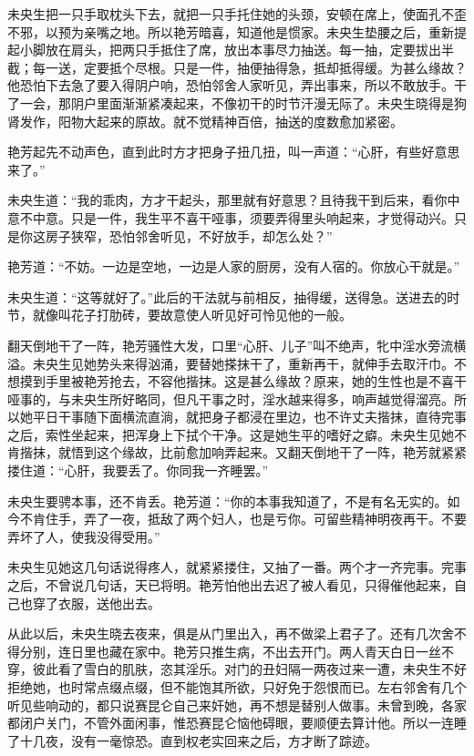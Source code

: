\documentclass[a4paper,12pt,UTF8,twoside]{ctexbook}
\begin{document}
未央生把一只手取枕头下去，就把一只手托住她的头颈，安顿在席上，使面孔不歪不邪，以预为亲嘴之地。所以艳芳暗喜，知道他是惯家。未央生垫腰之后，重新提起小脚放在肩头，把两只手抵住了席，放出本事尽力抽送。每一抽，定要拔出半截；每一送，定要抵个尽根。只是一件，抽便抽得急，抵却抵得缓。为甚么缘故？他恐怕下去急了要入得阴户响，恐怕邻舍人家听见，弄出事来，所以不敢放手。干了一会，那阴户里面渐渐紧凑起来，不像初干的时节汗漫无际了。未央生晓得是狗肾发作，阳物大起来的原故。就不觉精神百倍，抽送的度数愈加紧密。

艳芳起先不动声色，直到此时方才把身子扭几扭，叫一声道：“心肝，有些好意思来了。”

未央生道：“我的乖肉，方才干起头，那里就有好意思？且待我干到后来，看你中意不中意。只是一件，我生平不喜干哑事，须要弄得里头响起来，才觉得动兴。只是你这房子狭窄，恐怕邻舍听见，不好放手，却怎么处？”

艳芳道：“不妨。一边是空地，一边是人家的厨房，没有人宿的。你放心干就是。”

未央生道：“这等就好了。”此后的干法就与前相反，抽得缓，送得急。送进去的时节，就像叫花子打肋砖，要故意使人听见好可怜见他的一般。

翻天倒地干了一阵，艳芳骚性大发，口里“心肝、儿子”叫不绝声，牝中淫水旁流横溢。未央生见她势头来得汹涌，要替她搽抹干了，重新再干，就伸手去取汗巾。不想摸到手里被艳芳抢去，不容他揩抹。这是甚么缘故？原来，她的生性也是不喜干哑事的，与未央生所好略同，但凡干事之时，淫水越来得多，响声越觉得溜亮。所以她平日干事随下面横流直淌，就把身子都浸在里边，也不许丈夫揩抹，直待完事之后，索性坐起来，把浑身上下拭个干净。这是她生平的嗜好之癖。未央生见她不肯揩抹，就悟到这个缘故，比前愈加响弄起来。又翻天倒地干了一阵，艳芳就紧紧搂住道：“心肝，我要丢了。你同我一齐睡罢。”

未央生要骋本事，还不肯丢。艳芳道：“你的本事我知道了，不是有名无实的。如今不肯住手，弄了一夜，抵敌了两个妇人，也是亏你。可留些精神明夜再干。不要弄坏了人，使我没得受用。”

未央生见她这几句话说得疼人，就紧紧搂住，又抽了一番。两个才一齐完事。完事之后，不曾说几句话，天已将明。艳芳怕他出去迟了被人看见，只得催他起来，自己也穿了衣服，送他出去。

从此以后，未央生晓去夜来，俱是从门里出入，再不做梁上君子了。还有几次舍不得分别，连日里也藏在家中。艳芳只推生病，不出去开门。两人青天白日一丝不穿，彼此看了雪白的肌肤，恣其淫乐。对门的丑妇隔一两夜过来一遭，未央生不好拒绝她，也时常点缀点缀，但不能饱其所欲，只好免于怨恨而已。左右邻舍有几个听见些响动的，都只说赛昆仑自己来奸她，再不想是替别人做事。未曾到晚，各家都闭户关门，不管外面闲事，惟恐赛昆仑恼他碍眼，要顺便去算计他。所以一连睡了十几夜，没有一毫惊恐。直到权老实回来之后，方才断了踪迹。
\end{document}
